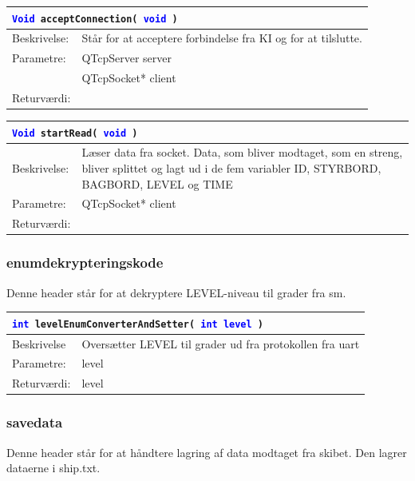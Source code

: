 \begin{table}[H]
\begin{tabular}{l p{12.5cm}}
\multicolumn{2}{l}{\texttt{\textcolor{blue}{Void} acceptConnection( \textcolor{blue}{void} )}} \\
\hline
Beskrivelse:&Står for at acceptere forbindelse fra KI og for at tilslutte.\\
Parametre:&QTcpServer server\\
				&QTcpSocket* client\\
Returværdi:&\\
\end{tabular}
\end{table}

\begin{table}[H]
\begin{tabular}{l p{12.5cm}}
\multicolumn{2}{l}{\texttt{\textcolor{blue}{Void} startRead( \textcolor{blue}{void} )}} \\
\hline
Beskrivelse:&Læser data fra socket. Data, som bliver modtaget, som en streng, bliver splittet og lagt ud i de fem variabler ID, STYRBORD, BAGBORD, LEVEL og TIME\\
Parametre:&QTcpSocket* client\\
Returværdi:&\\
\end{tabular}
\end{table}

\subsubsection{enumdekrypteringskode}
Denne header står for at dekryptere LEVEL-niveau til grader fra sm. 

\begin{table}[H]
\begin{tabular}{l p{12.5cm}}
\multicolumn{2}{l}{\texttt{\textcolor{blue}{int} levelEnumConverterAndSetter( \textcolor{blue}{int level} )}} \\
\hline
Beskrivelse & Oversætter LEVEL til grader ud fra protokollen fra uart\\
Parametre: & level\\
Returværdi:& level\\
\end{tabular}
\end{table}



\subsubsection{savedata}
Denne header står for at håndtere lagring af data modtaget fra skibet. Den lagrer dataerne i ship.txt.

